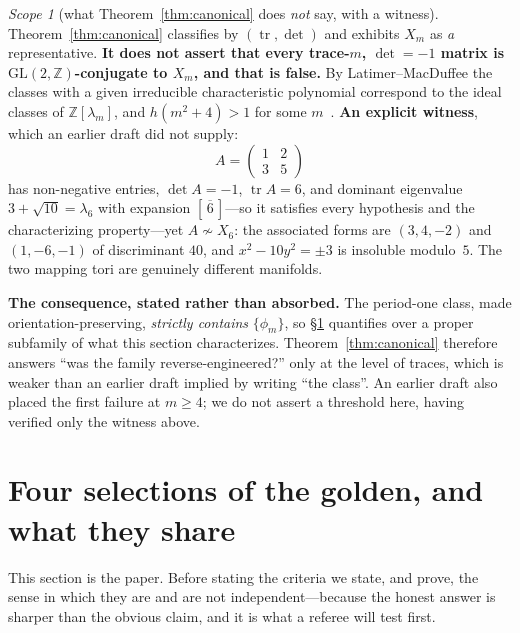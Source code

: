 \documentclass[11pt,reqno]{amsart}
\theoremstyle{plain}
\theoremstyle{definition}
\theoremstyle{remark}
\newtheorem{scope}[theorem]{Scope}
\newcommand{\Z}{\mathbb{Z}}
\newcommand{\GL}{\mathrm{GL}}
\newcommand{\tr}{\operatorname{tr}}
\begin{document}
\begin{scope}[what Theorem~\ref{thm:canonical} does \emph{not} say, with a witness]\label{sc:latimer}
Theorem~\ref{thm:canonical} classifies by $(\tr,\det)$ and exhibits $X_m$ as \emph{a}
representative. \textbf{It does not assert that every trace-$m$, $\det=-1$ matrix is
$\GL(2,\Z)$-conjugate to $X_m$, and that is false.} By Latimer--MacDuffee the classes
with a given irreducible characteristic polynomial correspond to the ideal classes of
$\Z[\lambda_m]$, and $h(m^2+4)>1$ for some $m$~\cite{LatimerMacDuffee}. \textbf{An explicit witness}, which an
earlier draft did not supply:
\[
   A=\begin{pmatrix}1&2\\3&5\end{pmatrix}
\]
has non-negative entries, $\det A=-1$, $\tr A=6$, and dominant eigenvalue
$3+\sqrt{10}=\lambda_6$ with expansion $[\,\overline{6}\,]$---so it satisfies every
hypothesis and the characterizing property---yet $A\not\sim X_6$: the associated forms
are $(3,4,-2)$ and $(1,-6,-1)$ of discriminant $40$, and $x^2-10y^2=\pm3$ is insoluble
modulo~$5$. The two mapping tori are genuinely different manifolds.

\textbf{The consequence, stated rather than absorbed.} The period-one class, made
orientation-preserving, \emph{strictly contains} $\{\phi_m\}$, so \S\ref{sec:four}
quantifies over a proper subfamily of what this section characterizes.
Theorem~\ref{thm:canonical} therefore answers ``was the family reverse-engineered?''
only at the level of traces, which is weaker than an earlier draft implied by writing
``the class''. An earlier draft also placed the first failure at $m\ge4$; we do not
assert a threshold here, having verified only the witness above.
\end{scope}

\section{Four selections of the golden, and what they share}\label{sec:four}

This section is the paper. Before stating the criteria we state, and prove, the sense in
which they are and are not independent---because the honest answer is sharper than the
obvious claim, and it is what a referee will test first.
\end{document}
